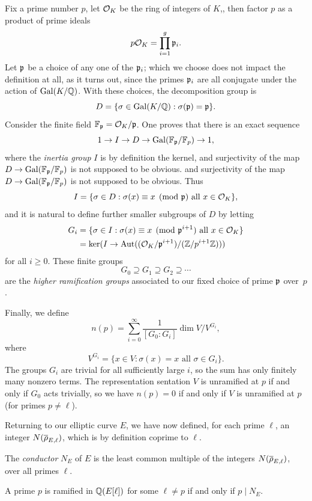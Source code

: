 \documentclass{book}
\begin{document}
Fix a prime number $p$, let $\mathcal{O}_K$ be the ring of integers
of $K$,, then factor $p$ as a product of prime ideals
$$
  p\mathcal{O}_K = \prod_{i=1}^g \mathfrak{p}_i.
$$
Let $\mathfrak{p}$ be a choice of any one of the $\mathfrak{p}_i$; which
we choose does not impact the definition at all, as it turns out, since
the primes $\mathfrak{p}_i$ are all conjugate under the action of
$\operatorname{Gal}(K/\mathbb{Q})$.
With these choices, the decomposition group is
$$
  D = \{\sigma \in \operatorname{Gal}(K/\mathbb{Q}) : \sigma(\mathfrak{p}) = \mathfrak{p}\}.
$$
Consider the finite field $\mathbb{F}_{\mathfrak{p}} = \mathcal{O}_K/\mathfrak{p}$.
One proves that there is an exact sequence
$$
  1 \to I \to D \to \operatorname{Gal}(\mathbb{F}_{\mathfrak{p}} / \mathbb{F}_p) \to 1,
$$
where the {\em inertia group} $I$ is by definition the kernel,
and surjectivity of the map $D \to \operatorname{Gal}(\mathbb{F}_{\mathfrak{p}} / \mathbb{F}_p)$
is not supposed to be obvious.
and surjectivity of the map $D \to \operatorname{Gal}(\mathbb{F}_{\mathfrak{p}} / \mathbb{F}_p)$
is not supposed to be obvious.
Thus
$$
  I = \{\sigma \in D : \sigma(x) \equiv x \pmod{\mathfrak{p}} \text{ all } x \in \mathcal{O}_K\},
$$
and it is natural to define further smaller subgroups of $D$ by letting
\begin{align*}
  G_i &= \{\sigma \in I : \sigma(x) \equiv x \pmod{\mathfrak{p}^{i+1}} \text{ all } x \in \mathcal{O}_K \}\\
      &= \ker(I \to \operatorname{Aut}((\mathcal{O}_K/\mathfrak{p}^{i+1}) / (\mathbb{Z}/p^{i+1}\mathbb{Z})))
\end{align*}
for all $i\geq 0$.  These finite groups
$$G_0 \supseteq G_1 \supseteq G_2 \supseteq \cdots $$
are the {\em higher ramification groups} associated
to our fixed choice of prime $\mathfrak{p}$ over~$p$.

Finally, we define
$$
n(p) = \sum_{i=0}^{\infty} \frac{1}{[G_0:G_i]}\dim V/V^{G_i},
$$
where
$$
  V^{G_i} = \{x \in V : \sigma(x) = x \text{ all } \sigma\in G_i\}.
$$
The groups $G_i$ are trivial for all sufficiently large $i$,
so the sum has only finitely many nonzero terms.
The representation sentation $V$ is unramified at $p$ if and only
if $G_0$ acts trivially, so we have $n(p)=0$  if and only
if $V$ is unramified at $p$ (for primes $p\neq \ell$).

Returning to our elliptic curve $E$, we have now defined,
for each prime $\ell$, an integer
$N(\overline{\rho}_{E,\ell})$, which is by definition coprime to $\ell$.
\begin{definition}[Conductor]
The {\em conductor} $N_E$ of $E$ is the least common multiple  of
the integers $N(\overline{\rho}_{E,\ell})$, over all primes $\ell$.
\end{definition}

\begin{corollary}
A prime $p$ is ramified in $\mathbb{Q}(E[\ell])$ for some $\ell\neq p$
if and only if $p\mid N_E$.
\end{corollary}
\end{document}
